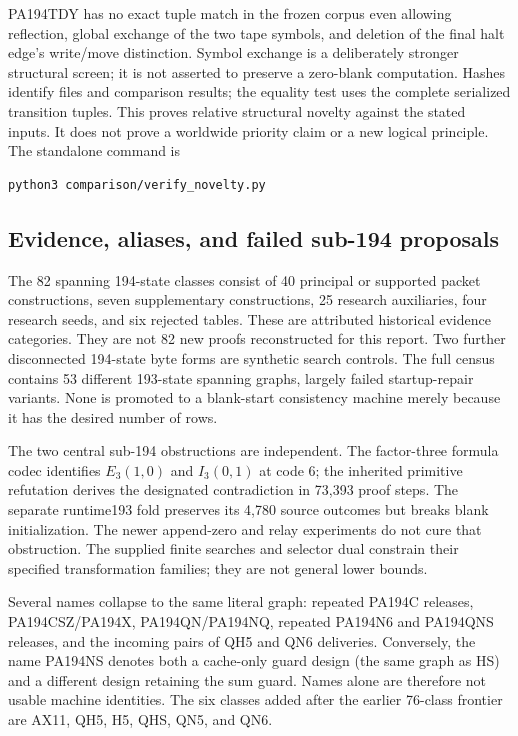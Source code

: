 PA194TDY has no exact tuple match in the frozen corpus even allowing reflection,
global exchange of the two tape symbols, and deletion of the final halt edge's
write/move distinction. Symbol exchange is a deliberately stronger structural
screen; it is not asserted to preserve a zero-blank computation. Hashes identify
files and comparison results; the equality test uses the complete serialized
transition tuples. This proves relative structural novelty against the stated
inputs. It does not prove a worldwide priority claim or a new logical principle.
The standalone command is
\begin{Verbatim}[fontsize=\small]
python3 comparison/verify_novelty.py
\end{Verbatim}

\subsection{Evidence, aliases, and failed sub-194 proposals}
The 82 spanning 194-state classes consist of 40 principal or supported packet
constructions, seven supplementary constructions, 25 research auxiliaries,
four research seeds, and six rejected tables. These are attributed historical
evidence categories. They are not 82 new proofs reconstructed for this report.
Two further disconnected 194-state byte forms are synthetic search controls.
The full census contains 53 different 193-state spanning graphs, largely
failed startup-repair variants. None is promoted to a blank-start consistency
machine merely because it has the desired number of rows.

The two central sub-194 obstructions are independent. The factor-three formula
codec identifies $E_3(1,0)$ and $I_3(0,1)$ at code 6; the inherited primitive
refutation derives the designated contradiction in 73,393 proof steps. The
separate runtime193 fold preserves its 4,780 source outcomes but breaks blank
initialization. The newer append-zero and relay experiments do not cure that
obstruction. The supplied finite searches and selector dual constrain their
specified transformation families; they are not general lower bounds.

Several names collapse to the same literal graph: repeated PA194C releases,
PA194CSZ/PA194X, PA194QN/PA194NQ, repeated PA194N6 and PA194QNS releases,
and the incoming pairs of QH5 and QN6 deliveries. Conversely, the name
PA194NS denotes both a cache-only guard design (the same graph as HS) and a
different design retaining the sum guard. Names alone are therefore not
usable machine identities. The six classes added after the earlier 76-class
frontier are AX11, QH5, H5, QHS, QN5, and QN6.

